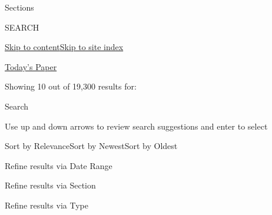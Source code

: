Sections

SEARCH

\protect\hyperlink{site-content}{Skip to
content}\protect\hyperlink{site-index}{Skip to site index}

\href{https://myaccount.nytimes3xbfgragh.onion/auth/login?response_type=cookie\&client_id=vi}{}

\href{https://www.nytimes3xbfgragh.onion/section/todayspaper}{Today's
Paper}

Showing 10 out of 19,300 results for:

Search

Use up and down arrows to review search suggestions and enter to select

Sort by RelevanceSort by NewestSort by Oldest

Refine results via Date Range

Refine results via Section

Refine results via Type

